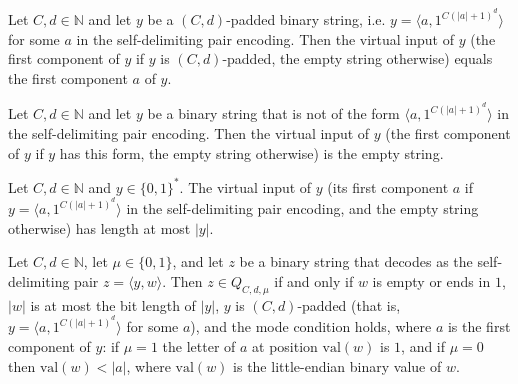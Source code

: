 \begin{lemma}
\label{Complexity.epadVirt_of_valid}
\leanok
{}
Let $C, d \in \mathbb{N}$ and let $y$ be a $(C,d)$-padded binary string, i.e.
$y = \langle a, 1^{C(|a|+1)^d}\rangle$ for some $a$ in the self-delimiting pair encoding. Then
the virtual input of $y$ (the first component of $y$ if $y$ is $(C,d)$-padded, the empty string
otherwise) equals the first component $a$ of $y$.
\end{lemma}

\begin{lemma}
\label{Complexity.epadVirt_of_not_valid}
\leanok
{}
Let $C, d \in \mathbb{N}$ and let $y$ be a binary string that is not of the form
$\langle a, 1^{C(|a|+1)^d}\rangle$ in the self-delimiting pair encoding. Then the virtual input
of $y$ (the first component of $y$ if $y$ has this form, the empty string otherwise) is the
empty string.
\end{lemma}

\begin{lemma}
\label{Complexity.epadVirt_length_le}
\leanok
{}
Let $C, d \in \mathbb{N}$ and $y \in \{0,1\}^*$. The virtual input of $y$ (its first component
$a$ if $y = \langle a, 1^{C(|a|+1)^d}\rangle$ in the self-delimiting pair encoding, and the
empty string otherwise) has length at most $|y|$.
\end{lemma}

\begin{lemma}
\label{Complexity.epad_mem_Q_iff}
\leanok
{}
Let $C, d \in \mathbb{N}$, let $\mu \in \{0,1\}$, and let $z$ be a binary string that decodes as
the self-delimiting pair $z = \langle y, w\rangle$. Then $z \in Q_{C,d,\mu}$ if and only if $w$ is
empty or ends in $1$, $|w|$ is at most the bit length of $|y|$, $y$ is $(C,d)$-padded (that is,
$y = \langle a, 1^{C(|a|+1)^d}\rangle$ for some $a$), and the mode condition holds, where $a$ is the first component of $y$: if $\mu = 1$ the letter of $a$ at position $\mathrm{val}(w)$
is $1$, and if $\mu = 0$ then $\mathrm{val}(w) < |a|$, where $\mathrm{val}(w)$ is the
little-endian binary value of $w$.
\end{lemma}

